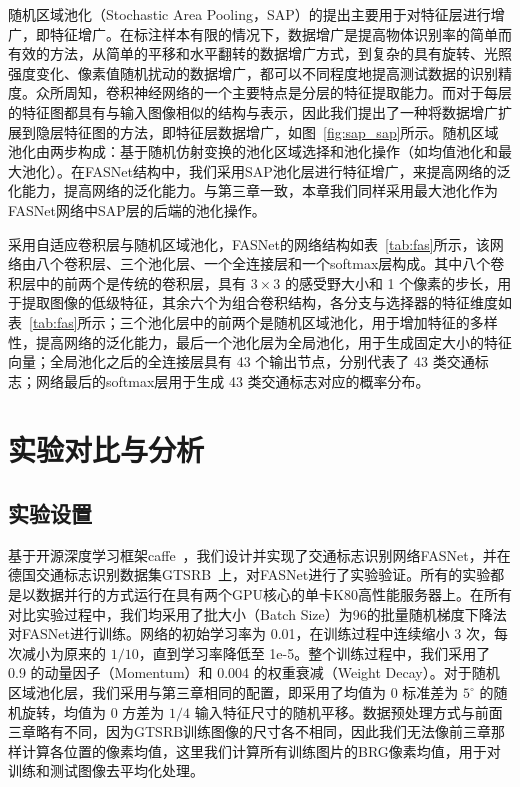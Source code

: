 随机区域池化（Stochastic Area Pooling，SAP）的提出主要用于对特征层进行增广，即特征增广。在标注样本有限的情况下，数据增广是提高物体识别率的简单而有效的方法，从简单的平移和水平翻转的数据增广方式，到复杂的具有旋转、光照强度变化、像素值随机扰动的数据增广，都可以不同程度地提高测试数据的识别精度。众所周知，卷积神经网络的一个主要特点是分层的特征提取能力。而对于每层的特征图都具有与输入图像相似的结构与表示，因此我们提出了一种将数据增广扩展到隐层特征图的方法，即特征层数据增广，如图~\ref{fig:sap_sap}所示。随机区域池化由两步构成：基于随机仿射变换的池化区域选择和池化操作（如均值池化和最大池化）。在FASNet结构中，我们采用SAP池化层进行特征增广，来提高网络的泛化能力，提高网络的泛化能力。与第三章一致，本章我们同样采用最大池化作为FASNet网络中SAP层的后端的池化操作。

采用自适应卷积层与随机区域池化，FASNet的网络结构如表~\ref{tab:fas}所示，该网络由八个卷积层、三个池化层、一个全连接层和一个softmax层构成。其中八个卷积层中的前两个是传统的卷积层，具有 $3{\times}3$ 的感受野大小和 1 个像素的步长，用于提取图像的低级特征，其余六个为组合卷积结构，各分支与选择器的特征维度如表~\ref{tab:fas}所示；三个池化层中的前两个是随机区域池化，用于增加特征的多样性，提高网络的泛化能力，最后一个池化层为全局池化，用于生成固定大小的特征向量；全局池化之后的全连接层具有 43 个输出节点，分别代表了 43 类交通标志；网络最后的softmax层用于生成 43 类交通标志对应的概率分布。


\section{实验对比与分析}
\label{sec:seg:exp}

\subsection{实验设置}

基于开源深度学习框架caffe~\cite{jia2014caffe}，我们设计并实现了交通标志识别网络FASNet，并在德国交通标志识别数据集GTSRB~\cite{stallkamp2012man}上，对FASNet进行了实验验证。所有的实验都是以数据并行的方式运行在具有两个GPU核心的单卡K80高性能服务器上。在所有对比实验过程中，我们均采用了批大小（Batch Size）为96的批量随机梯度下降法对FASNet进行训练。网络的初始学习率为 0.01，在训练过程中连续缩小 3 次，每次减小为原来的 $1/10$，直到学习率降低至 1e-5。整个训练过程中，我们采用了 0.9 的动量因子（Momentum）和 0.004 的权重衰减（Weight Decay）。对于随机区域池化层，我们采用与第三章相同的配置，即采用了均值为 0 标准差为 $5^{\circ}$ 的随机旋转，均值为 0 方差为 $1/4$ 输入特征尺寸的随机平移。数据预处理方式与前面三章略有不同，因为GTSRB训练图像的尺寸各不相同，因此我们无法像前三章那样计算各位置的像素均值，这里我们计算所有训练图片的BRG像素均值，用于对训练和测试图像去平均化处理。


